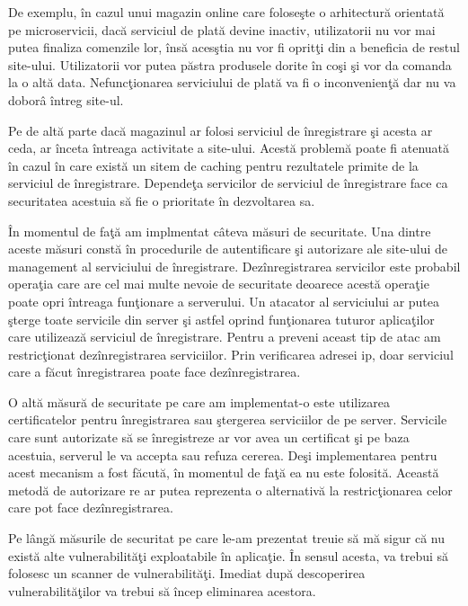 \documentclass[a4paper,12pt]{report}
\begin{document}
De exemplu, \^in cazul unui
magazin online care folose\c ste o arhitectur\u a orientat\u a pe microservicii, dac\u a
serviciul de plat\u a devine inactiv, utilizatorii nu vor mai putea finaliza comenzile lor, \^ins\u a
aces\c stia nu vor fi oprit\c ti din a beneficia de restul site-ului. Utilizatorii vor putea p\u astra 
produsele dorite \^in co\c si \c si vor da comanda la o alt\u a data. Nefunc\c tionarea 
serviciului de plat\u a va fi o inconvenien\c t\u a dar nu va dobor\^a \^intreg site-ul.

Pe de alt\u a parte dac\u a magazinul ar folosi serviciul de \^inregistrare \c si acesta ar ceda,
ar \^inceta \^intreaga activitate a site-ului. Acest\u a problem\u a poate fi atenuat\u a \^in cazul 
\^in care exist\u a un sitem de caching pentru rezultatele primite de la serviciul de \^inregistrare.
Depende\c ta servicilor de serviciul de \^inregistrare face ca securitatea acestuia s\u a fie 
o prioritate \^in dezvoltarea sa.

\^In momentul de fa\c t\u a am implmentat c\^ateva m\u asuri de securitate. Una dintre aceste 
m\u asuri const\u a \^in procedurile de autentificare \c si autorizare ale site-ului de management 
al serviciului de \^inregistrare. Dez\^inregistrarea servicilor este probabil opera\c tia care are 
cel mai multe nevoie de securitate deoarece acest\u a opera\c tie poate opri \^intreaga fun\c tionare 
a serverului. Un atacator al serviciului ar putea \c sterge toate servicile din server \c si astfel 
oprind fun\c tionarea tuturor aplica\c tilor care utilizeaz\u a serviciul de \^inregistrare.
Pentru a preveni aceast tip de atac am restric\c tionat dez\^inregistrarea serviciilor.
Prin verificarea adresei ip, doar serviciul care a f\u acut \^inregistrarea poate face dez\^inregistrarea.

O alt\u a m\u asur\u a de securitate pe care am implementat-o este utilizarea certificatelor pentru 
\^inregistrarea sau \c stergerea serviciilor de pe server. Servicile care sunt autorizate s\u a se \^inregistreze 
ar vor avea un certificat \c si pe baza acestuia, serverul le va accepta sau refuza cererea.
De\c si implementarea pentru acest mecanism a fost f\u acut\u a, \^in momentul de fa\c t\u a
ea nu este folosit\u a. Aceast\u a metod\u a de autorizare re ar putea reprezenta o alternativ\u a la restric\c tionarea 
celor care pot face dez\^inregistrarea.

Pe l\^ang\u a m\u asurile de securitat pe care le-am prezentat treuie s\u a m\u a sigur c\u a nu exist\u a
alte vulnerabilit\u a\c ti exploatabile \^in aplica\c tie. \^In sensul acesta, va trebui s\u a folosesc 
un scanner de vulnerabilit\u a\c ti. Imediat dup\u a descoperirea vulnerabilit\u a\c tilor va trebui s\u a 
\^incep eliminarea acestora.
\end{document}
